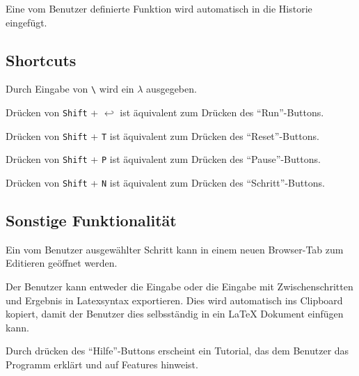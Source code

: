 \documentclass[parskip=full,11pt,twoside]{scrartcl}
\begin{document}
Eine vom Benutzer definierte Funktion wird automatisch in die Historie eingefügt.

\subsection{Shortcuts}

Durch Eingabe von \texttt{\textbackslash} wird ein \texttt{$\lambda$} ausgegeben.

Drücken von \texttt{Shift} + \texttt{$\hookleftarrow$} ist äquivalent zum Drücken des \enquote{Run}-Buttons.

Drücken von \texttt{Shift} + \texttt{T} ist äquivalent zum Drücken des \enquote{Reset}-Buttons.

Drücken von \texttt{Shift} + \texttt{P} ist äquivalent zum Drücken des \enquote{Pause}-Buttons.

Drücken von \texttt{Shift} + \texttt{N} ist äquivalent zum Drücken des \enquote{Schritt}-Buttons.



\subsection{Sonstige Funktionalität}

Ein vom Benutzer ausgewählter Schritt kann in einem neuen Browser-Tab zum Editieren geöffnet werden.

Der Benutzer kann entweder die Eingabe oder die Eingabe mit Zwischenschritten und Ergebnis in Latexsyntax exportieren. Dies wird automatisch ins Clipboard kopiert, damit der Benutzer dies selbsständig in ein LaTeX Dokument einfügen kann.

Durch drücken des \enquote {Hilfe}-Buttons erscheint ein Tutorial, das dem Benutzer das Programm erklärt und auf Features hinweist.
\end{document}
